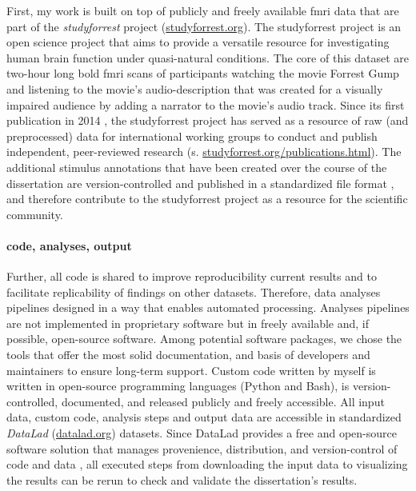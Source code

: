 First, my work is built on top of publicly and freely available \ac{fmri} data
that are part of the \textit{studyforrest} project
(\href{www.studyforrest.org}{\url{studyforrest.org}}).
%
The studyforrest project is an open science project that aims to provide a
versatile resource for investigating human brain function under quasi-natural
conditions.
%
The core of this dataset are two-hour long \ac{bold} \ac{fmri} scans of
participants watching the movie Forrest Gump \citep{ForrestGumpMovie} and
listening to the movie's audio-description that was created for a visually
impaired audience by adding a narrator to the movie's audio track.
%
Since its first publication in 2014 \citep{hanke2014audiomovie}, the
studyforrest project has served as a resource of raw (and preprocessed) data for
international working groups to conduct and publish independent, peer-reviewed
research (s.
\href{www.studyforrest.org/publications.html}{\url{studyforrest.org/publications.html}}).
%
The additional stimulus annotations that have been created over the course of
the dissertation are version-controlled and published in a standardized file
format \citep{haeusler2021speechanno}, and therefore contribute to the
studyforrest project as a resource for the scientific community.


\paragraph{code, analyses, output}

Further, all code is shared to improve reproducibility current results and to
facilitate replicability of findings on other datasets.
Therefore, data analyses pipelines designed in a way that enables automated
processing.
%
Analyses pipelines are not implemented in proprietary software but in freely
available and, if possible, open-source software.
Among potential software packages, we chose the tools that offer the most solid
documentation, and basis of developers and maintainers to ensure long-term
support.
Custom code written by myself is written in open-source programming languages
(Python and Bash), is version-controlled, documented, and released publicly and
freely accessible.
%
All input data, custom code, analysis steps and output data are accessible in
standardized \textit{DataLad} (\href{www.datalad.org}{datalad.org}) datasets.
Since DataLad provides a free and open-source software solution that manages
provenience, distribution, and version-control of code and data
\citep{halchenko2021datalad}, all executed steps from downloading the input data
to visualizing the results can be rerun to check and validate the dissertation's
results.


